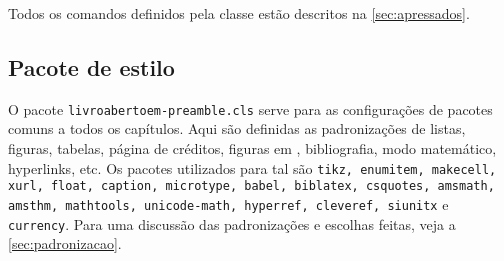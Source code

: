 Todos os comandos definidos pela classe estão descritos na
\cref{sec:apressados}.

\subsection{Pacote de estilo}

O pacote \verb|livroabertoem-preamble.cls| serve para as configurações
de pacotes comuns a todos os capítulos. Aqui são definidas as
padronizações de listas, figuras, tabelas, página de créditos, figuras
em \TikZ, bibliografia, modo matemático, hyperlinks, etc. Os pacotes
utilizados para tal são \texttt{tikz, enumitem, makecell, xurl, float,
	caption, microtype, babel, biblatex, csquotes, amsmath, amsthm,
	mathtools, unicode-math, hyperref, cleveref, siunitx} e
\verb|currency|. Para uma discussão das padronizações e escolhas
feitas, veja a \cref{sec:padronizacao}.

